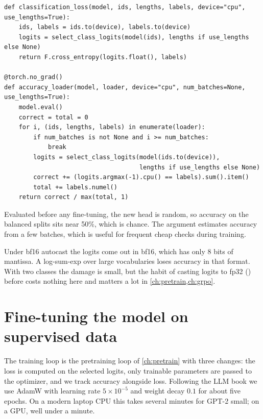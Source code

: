 \begin{lstlisting}[caption={Loss on a batch and accuracy over a loader.},label={lst:classify:acc}]
def classification_loss(model, ids, lengths, labels, device="cpu", use_lengths=True):
    ids, labels = ids.to(device), labels.to(device)
    logits = select_class_logits(model(ids), lengths if use_lengths else None)
    return F.cross_entropy(logits.float(), labels)

@torch.no_grad()
def accuracy_loader(model, loader, device="cpu", num_batches=None, use_lengths=True):
    model.eval()
    correct = total = 0
    for i, (ids, lengths, labels) in enumerate(loader):
        if num_batches is not None and i >= num_batches:
            break
        logits = select_class_logits(model(ids.to(device)),
                                     lengths if use_lengths else None)
        correct += (logits.argmax(-1).cpu() == labels).sum().item()
        total += labels.numel()
    return correct / max(total, 1)
\end{lstlisting}

Evaluated before any fine-tuning, the new head is random, so accuracy on the balanced
splits sits near 50\%, which is chance. The  argument estimates
accuracy from a few batches, which is useful for frequent cheap checks during training.

\begin{pitfall}
Under bf16 autocast the logits come out in bf16, which has only 8 bits of mantissa. A
log-sum-exp over large vocabularies loses accuracy in that format. With two classes
the damage is small, but the habit of casting logits to fp32 ()
before  costs nothing here and matters a lot in
\cref{ch:pretrain,ch:grpo}.
\end{pitfall}

\section{Fine-tuning the model on supervised data}\label{sec:classify:train}

The training loop is the pretraining loop of \cref{ch:pretrain} with three changes: the
loss is computed on the selected logits, only trainable parameters are passed to the
optimizer, and we track accuracy alongside loss. Following the LLM book we use AdamW
with learning rate $5\times10^{-5}$ and weight decay $0.1$ for about five epochs. On a
modern laptop CPU this takes several minutes for GPT-2 small; on a GPU, well under a
minute.

